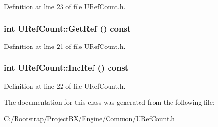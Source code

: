Definition at line 23 of file URefCount.h.\hypertarget{class_u_ref_count_14478a3b8179a33ea50f3db7c70b502c}{
\subsubsection[{GetRef}]{\setlength{\rightskip}{0pt plus 5cm}int URefCount::GetRef () const}}
\label{class_u_ref_count_14478a3b8179a33ea50f3db7c70b502c}




Definition at line 21 of file URefCount.h.\hypertarget{class_u_ref_count_57a30bf0235023f3c1ac4cab85d58fcf}{
\subsubsection[{IncRef}]{\setlength{\rightskip}{0pt plus 5cm}int URefCount::IncRef () const}}
\label{class_u_ref_count_57a30bf0235023f3c1ac4cab85d58fcf}




Definition at line 22 of file URefCount.h.

The documentation for this class was generated from the following file:\begin{CompactItemize}
\item 
C:/Bootstrap/ProjectBX/Engine/Common/\hyperlink{_u_ref_count_8h}{URefCount.h}\end{CompactItemize}
